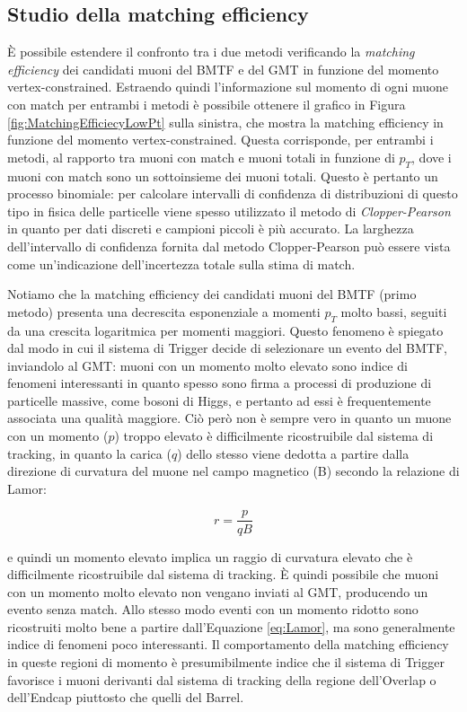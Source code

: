 \subsection{Studio della matching efficiency}
\label{sec:MatchingEfficiency}

È possibile estendere il confronto tra i due metodi verificando la \textit{matching efficiency} dei candidati muoni del BMTF e del GMT in funzione del momento vertex-constrained. Estraendo quindi l'informazione sul momento di ogni muone con match per entrambi i metodi è possibile ottenere il grafico in Figura \ref{fig:MatchingEfficiecyLowPt} sulla sinistra, che mostra la matching efficiency in funzione del momento vertex-constrained. 
Questa corrisponde, per entrambi i metodi, al rapporto tra muoni con match e muoni totali in funzione di $p_T$, dove i muoni con match sono un sottoinsieme dei muoni totali. Questo è pertanto un processo binomiale: per calcolare intervalli di confidenza di distribuzioni di questo tipo in fisica delle particelle viene spesso utilizzato il metodo di \textit{Clopper-Pearson} in quanto per dati discreti e campioni piccoli è più accurato. La larghezza dell’intervallo di confidenza fornita dal metodo Clopper-Pearson può essere vista come un’indicazione dell’incertezza totale sulla stima di match.


Notiamo che la matching efficiency dei candidati muoni del BMTF (primo metodo) presenta una decrescita esponenziale a momenti $p_T$ molto bassi, seguiti da una crescita logaritmica per momenti maggiori. Questo fenomeno è spiegato dal modo in cui il sistema di Trigger decide di selezionare un evento del BMTF, inviandolo al GMT: muoni con un momento molto elevato sono indice di fenomeni interessanti in quanto spesso sono firma a processi di produzione di particelle massive, come bosoni di Higgs, e pertanto ad essi è frequentemente associata una qualità maggiore. Ciò però non è sempre vero in quanto un muone con un momento ($p$) troppo elevato è difficilmente ricostruibile dal sistema di tracking, in quanto la carica ($q$) dello stesso viene dedotta a partire dalla direzione di curvatura del muone nel campo magnetico (B) secondo la relazione di Lamor:

\begin{equation}
  \label{eq:Lamor}
  r = \frac{p}{qB}
\end{equation}

e quindi un momento elevato implica un raggio di curvatura elevato che è difficilmente ricostruibile dal sistema di tracking. È quindi possibile che muoni con un momento molto elevato non vengano inviati al GMT, producendo un evento senza match.  
Allo stesso modo eventi con un momento ridotto sono ricostruiti molto bene a partire dall'Equazione \ref{eq:Lamor}, ma sono generalmente indice di fenomeni poco interessanti. Il comportamento della matching efficiency in queste regioni di momento è presumibilmente indice che il sistema di Trigger favorisce i muoni derivanti dal sistema di tracking della regione dell'Overlap o dell'Endcap piuttosto che quelli del Barrel.

